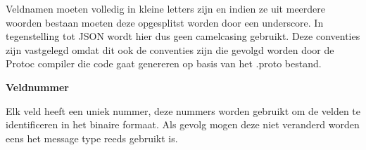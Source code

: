 Veldnamen moeten volledig in kleine letters zijn en indien ze uit meerdere woorden bestaan moeten deze opgesplitst worden door een underscore. In tegenstelling tot JSON wordt hier dus geen camelcasing gebruikt. Deze conventies zijn vastgelegd omdat dit ook de conventies zijn die gevolgd worden door de Protoc compiler die code gaat genereren op basis van het .proto bestand.

\textbf{Veldnummer}

Elk veld heeft een uniek nummer, deze nummers worden gebruikt om de velden te identificeren in het binaire formaat. Als gevolg mogen deze niet veranderd worden eens het message type reeds gebruikt is.









